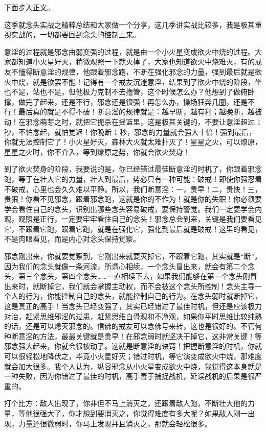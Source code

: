 下面步入正文。

这季就念头实战之精粹总结和大家做一个分享，这几季讲实战比较多，我是极其重视实战的，一切都要回到念头的控制上来。

意淫的过程就是邪念由弱变强的过程，就是由一个小火星变成欲火中烧的过程。大家都知道小火星好灭，稍微观照一下就灭掉了，大家也知道欲火中烧难灭，有的戒友不懂得断意淫的规律，他跟着邪念跑，不断在强化邪念的力量，强到最后就是欲火中烧，就是欲罢不能！记得有一个戒友沉迷意淫，结果到了欲火中烧的阶段，坐也不是，站也不是，但他极力克制不去撸管，这个时候怎么办？他想到了做俯卧撑，做完了起来，还是不行，邪念还是很强！再怎么办，操场狂奔几圈，还是不行！最后真的就是不得不破！断意淫的规律就是：越早断，越有利；越晚断，越被动！在邪念萌芽之时，就把它扼杀在摇篮里，这是极其关键的，不要让意淫超过 1 秒，不怕念起，就怕觉迟！你晚断 1 秒，邪念的力量就会强大十倍！强到最后，你就无法控制它了！小火星好灭，森林大火就太难扑灭了！星星之火，可以燎原，星星之火时，你不介入，等到燎原之势，你就会欲火焚身！

到了欲火焚身的阶段，我要说的是，你已经错过最佳断意淫的时机了，你跟着邪念跑，等于在壮大它的力量，壮大到最后，势必只有一种可能：破戒！即使你强忍着不破戒，心里也会久久难以平静。所以，我们断意淫：一，贵早！二，贵快！三，贵狠！你看不见邪念，跟着邪念跑，这就是你的不作为！就是你的失职！你必须要学会看住自己的念头，识别出哪些念头容易破戒，要保持警觉。我们一定要学会内观，观照是正行，一定要牢牢看住自己的念头！邪念总会到来，关键是我们要看见它，不跟着它跑，跟着它跑，就是在强化它，强化到最后就是破戒！这里的看见，不是肉眼看见，而是内心对念头保持觉察。

邪念刚出来，你就要觉察到，它刚出来就要灭掉它，不跟着它跑，其实就是“断”，因为我们的念头就像一条河流，所谓心相续，一个念头冒出来，就会有第二个念头，第三个念头，第四个念头……一直相续下去，如果我们能够在第一个念头刚冒出来时，就断掉它，我们就会掌握主动权，而不会被这个念头所控制！念头主导一个人的行为，你能控制自己的念头，就能控制自己的行为。在念头弱时就断掉它，这是真正的高手！当念头已经变强了，其实已经错过了最佳时机，但还是应该极力对治，赶紧思维邪淫的过患，赶紧思维白骨观和不净观，如果你平时思维比较纯熟的话，还是可以熄灭邪念的。信佛的戒友可以念佛号来转，这也是很好的。不管何种断意淫的方法，最最关键就是贵早！在邪念弱时就坚决干掉它，这非常关键！等邪念强大起来，你就会很被动了。这就是断意淫的诀窍！把握断意淫的时机，你就可以很轻松地降伏之，毕竟小火星好灭；错过时机，等它演变成欲火中烧，那难度就会加大很多。我个人认为，纵容邪念从小火星变成欲火中烧，我觉得这本身就是一种失败，因为你错过了最佳的时机，高手善于捕捉战机，延误战机的后果是很严重的。

打个比方：敌人出现了，你非但不马上消灭之，还跟着敌人跑，不断壮大他的力量，等他很强大了，你才想到要消灭之，你觉得难度有多大呢？如果敌人刚一出现，力量还很微弱时，你马上发现并且消灭之，那就会轻松很多。

